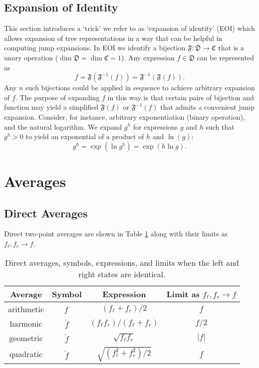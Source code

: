 \documentclass[10pt]{article}
\newcommand{\avg}[1]{\overline{#1}\,}
\newcommand{\harmavg}[1]{\acute{#1}}
\newcommand{\geomavg}[1]{\breve{#1}}
\newcommand{\quadavg}[1]{\ddot{#1}}
\begin{document}
\subsection{Expansion of Identity} \label{sec: expansion of identity}
This section introduces a `trick' we refer to as `expansion of identity' (EOI) which allows expansion of tree representations in a way that can be helpful in computing jump expansions.
In EOI we identify a bijection $\mathfrak{F}:\mathfrak{D}\to\mathfrak{C}$ that is a unary operation ($\dim\mathfrak{D}=\dim\mathfrak{C}=1$).
Any expression $f\in\mathfrak{D}$ can be represented as
\begin{equation}
	f = \mathfrak{F}(\mathfrak{F}^{-1}(f)) = \mathfrak{F}^{-1}(\mathfrak{F}(f)).
\end{equation}
Any $n$ such bijections could be applied in sequence to achieve arbitrary expansion of $f$.
The purpose of expanding $f$ in this way is that certain pairs of bijection and function may yield a simplified $\mathfrak{F}(f)$ or $\mathfrak{F}^{-1}(f)$ that admits a convenient jump expansion.
Consider, for instance, arbitrary exponentiation (binary operation), and the natural logarithm.
We expand $g^h$ for expressions $g$ and $h$ such that $g^h>0$ to yield an exponential of a product of $h$ and $\ln(g)$:
\begin{equation}
	g^h = \exp(\ln g^h) = \exp(h\ln g).
\end{equation}

\section{Averages} \label{sec: averages}
\subsection{Direct Averages}
Direct two-point averages are shown in Table \ref{tab: direct avgs} along with their limits as $f_\ell,f_r\to f$.
\begin{table}[h]
\caption{Direct averages, symbols, expressions, and limits when the left and right states are identical.}
\begin{center}
\begin{tabular}{c|c|c|c}
	Average & Symbol & Expression & Limit as $f_\ell,f_r\to f$ \\
	\hline
	arithmetic & $\avg{f}$ & $(f_\ell+f_r)/2$ & $f$ \\
	harmonic & $\harmavg{f}$ & $(f_\ell f_r)/(f_\ell+f_r)$ & $f/2$ \\
	geometric & $\geomavg{f}$ & $\sqrt{f_\ell f_r}$ & $|f|$ \\
	quadratic & $\quadavg{f}$ & $\sqrt{(f_\ell^2+f_r^2)/2}$ & $f$ \\
	\hline
\end{tabular}
\end{center}
\label{tab: direct avgs}
\end{table}
\end{document}
